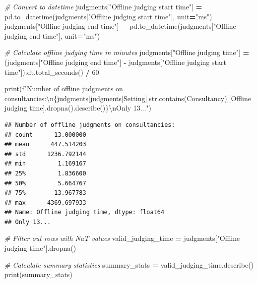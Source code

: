 \documentclass[
]{article}
\newenvironment{Shaded}{\begin{snugshade}}{\end{snugshade}}
\newcommand{\BuiltInTok}[1]{#1}
\newcommand{\CharTok}[1]{\textcolor[rgb]{0.31,0.60,0.02}{#1}}
\newcommand{\CommentTok}[1]{\textcolor[rgb]{0.56,0.35,0.01}{\textit{#1}}}
\newcommand{\DecValTok}[1]{\textcolor[rgb]{0.00,0.00,0.81}{#1}}
\newcommand{\NormalTok}[1]{#1}
\newcommand{\OperatorTok}[1]{\textcolor[rgb]{0.81,0.36,0.00}{\textbf{#1}}}
\newcommand{\SpecialCharTok}[1]{\textcolor[rgb]{0.00,0.00,0.00}{#1}}
\newcommand{\SpecialStringTok}[1]{\textcolor[rgb]{0.31,0.60,0.02}{#1}}
\newcommand{\StringTok}[1]{\textcolor[rgb]{0.31,0.60,0.02}{#1}}
\begin{document}
\begin{Shaded}
\begin{Highlighting}[]
\CommentTok{\# Convert to datetime}
\NormalTok{judgments[}\StringTok{"Offline judging start time"}\NormalTok{] }\OperatorTok{=}\NormalTok{ pd.to\_datetime(judgments[}\StringTok{"Offline judging start time"}\NormalTok{], unit}\OperatorTok{=}\StringTok{"ms"}\NormalTok{)}
\NormalTok{judgments[}\StringTok{"Offline judging end time"}\NormalTok{] }\OperatorTok{=}\NormalTok{ pd.to\_datetime(judgments[}\StringTok{"Offline judging end time"}\NormalTok{], unit}\OperatorTok{=}\StringTok{"ms"}\NormalTok{)}

\CommentTok{\# Calculate offline judging time in minutes}
\NormalTok{judgments[}\StringTok{"Offline judging time"}\NormalTok{] }\OperatorTok{=}\NormalTok{ (judgments[}\StringTok{"Offline judging end time"}\NormalTok{] }\OperatorTok{{-}}\NormalTok{ judgments[}\StringTok{"Offline judging start time"}\NormalTok{]).dt.total\_seconds() }\OperatorTok{/} \DecValTok{60}


\BuiltInTok{print}\NormalTok{(}\SpecialStringTok{f"Number of offline judgments on consultancies:}\CharTok{\textbackslash{}n}\SpecialCharTok{\{}\NormalTok{judgments[judgments[}\StringTok{\textquotesingle{}Setting\textquotesingle{}}\NormalTok{].}\BuiltInTok{str}\NormalTok{.contains(}\StringTok{\textquotesingle{}Consultancy\textquotesingle{}}\NormalTok{)][}\StringTok{\textquotesingle{}Offline judging time\textquotesingle{}}\NormalTok{]}\SpecialCharTok{.}\NormalTok{dropna()}\SpecialCharTok{.}\NormalTok{describe()}\SpecialCharTok{\}}\CharTok{\textbackslash{}n}\SpecialStringTok{Only 13..."}\NormalTok{)}
\end{Highlighting}
\end{Shaded}

\begin{verbatim}
## Number of offline judgments on consultancies:
## count      13.000000
## mean      447.514203
## std      1236.792144
## min         1.169167
## 25%         1.836600
## 50%         5.664767
## 75%        13.967783
## max      4369.697933
## Name: Offline judging time, dtype: float64
## Only 13...
\end{verbatim}

\begin{Shaded}
\begin{Highlighting}[]
\CommentTok{\# Filter out rows with NaT values}
\NormalTok{valid\_judging\_time }\OperatorTok{=}\NormalTok{ judgments[}\StringTok{"Offline judging time"}\NormalTok{].dropna()}

\CommentTok{\# Calculate summary statistics}
\NormalTok{summary\_stats }\OperatorTok{=}\NormalTok{ valid\_judging\_time.describe()}
\BuiltInTok{print}\NormalTok{(summary\_stats)}
\end{Highlighting}
\end{Shaded}
\end{document}
